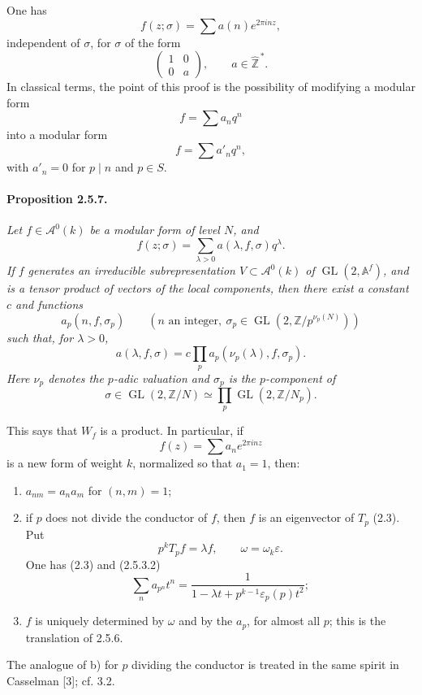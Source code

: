 \documentclass[10pt,a4paper]{article}
\providecommand{\GL}{\operatorname{GL}}
\providecommand{\Z}{\mathbb Z}
\providecommand{\Af}{\mathbb A^f}
\begin{document}
\clearpage
{}
\hypertarget{authority-37}{}
One has
\[
f(z;\sigma)=\sum a(n)e^{2\pi inz},
\]
independent of \(\sigma\), for \(\sigma\) of the form
\[
\begin{pmatrix}1&0\\0&a\end{pmatrix},\qquad a\in\widehat{\Z}^{\,*}.
\]
In classical terms, the point of this proof is the possibility of modifying a modular form
\[
f=\sum a_nq^n
\]
into a modular form
\[
f=\sum a'_nq^n,
\]
with \(a'_n=0\) for \(p\mid n\) and \(p\in S\).

\paragraph{Proposition 2.5.7.}{\itshape  Let \(f\in \mathcal A^0(k)\) be a modular form of level \(N\), and
\[
f(z;\sigma)=\sum_{\lambda>0}a(\lambda,f,\sigma)q^\lambda.
\]
If \(f\) generates an irreducible subrepresentation \(V\subset \mathcal A^0(k)\) of \(\GL(2,\Af)\), and is a tensor product of vectors of the local components, then there exist a constant \(c\) and functions
\[
a_p(n,f,\sigma_p)\qquad (n\text{ an integer},\ \sigma_p\in\GL(2,\Z/p^{\nu_p(N)}))
\]
such that, for \(\lambda>0\),
\[
a(\lambda,f,\sigma)=c\prod_p a_p(\nu_p(\lambda),f,\sigma_p).
\]
Here \(\nu_p\) denotes the \(p\)-adic valuation and \(\sigma_p\) is the \(p\)-component of
\[
\sigma\in\GL(2,\Z/N)\simeq\prod_p\GL(2,\Z/N_p).
\]\par}

This says that \(W_f\) is a product. In particular, if
\[
f(z)=\sum a_ne^{2\pi inz}
\]
is a new form of weight \(k\), normalized so that \(a_1=1\), then:
\begin{enumerate}[label=\alph*)]
\item \(a_{nm}=a_na_m\) for \((n,m)=1\);
\item if \(p\) does not divide the conductor of \(f\), then \(f\) is an eigenvector of \(T_p\) (2.3). Put
\[
p^kT_pf=\lambda f,
\qquad \omega=\omega_k\varepsilon.
\]
One has (2.3) and (2.5.3.2)
\[
\sum_n a_{p^n}t^n=\frac{1}{1-\lambda t+p^{k-1}\varepsilon_p(p)t^2};
\]
\item \(f\) is uniquely determined by \(\omega\) and by the \(a_p\), for almost all \(p\); this is the translation of 2.5.6.
\end{enumerate}

\clearpage
{}
\hypertarget{authority-38}{}
The analogue of b) for \(p\) dividing the conductor is treated in the same spirit in Casselman [3]; cf. 3.2.
\end{document}
